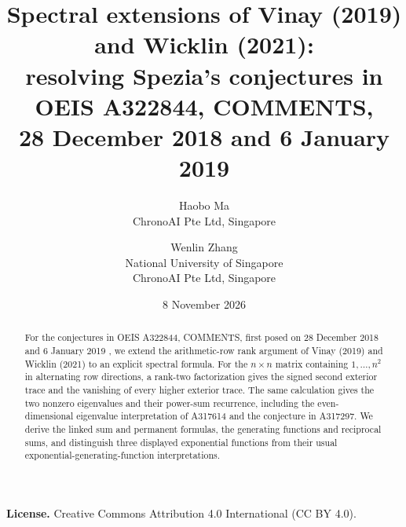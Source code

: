 \documentclass[11pt]{article}
\title{Spectral extensions of Vinay (2019) and Wicklin (2021):\\
resolving Spezia's conjectures in OEIS A322844, COMMENTS,\\
28 December 2018 and 6 January 2019}
\author{Haobo Ma\\\small ChronoAI Pte Ltd, Singapore
\and Wenlin Zhang\\\small National University of Singapore\\
\small ChronoAI Pte Ltd, Singapore}
\date{8 November 2026}
\begin{document}
\maketitle
\begin{abstract}
For the conjectures in OEIS A322844, COMMENTS, first posed on
28 December 2018 and 6 January 2019 \cite{posing}, we extend the arithmetic-row rank
argument of Vinay (2019) and Wicklin (2021) to an explicit spectral formula.
For the $n\times n$
matrix containing $1,\ldots,n^2$ in alternating row directions, a rank-two
factorization gives the signed second exterior trace and the vanishing of
every higher exterior trace. The same calculation gives the two nonzero
eigenvalues and their power-sum recurrence, including the even-dimensional
eigenvalue interpretation of A317614 and the conjecture in A317297. We derive the linked sum
and permanent formulas, the generating functions and reciprocal sums,
and distinguish three displayed exponential functions from their usual
exponential-generating-function interpretations.
\end{abstract}
\noindent\textbf{License.} Creative Commons Attribution 4.0 International (CC BY 4.0).
\end{document}
